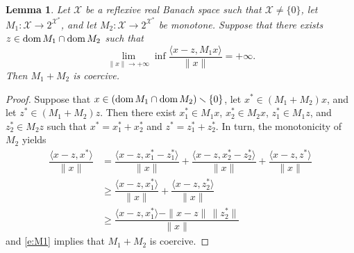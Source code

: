 \documentclass[a4paper,11pt,fleqn]{article}
\renewcommand{\geq}{\ensuremath{\geqslant}}
\newcommand{\pair}[2]{\langle{{#1},{#2}}\rangle}
\newcommand{\XX}{\ensuremath{{\mathcal X}}}
\newcommand{\pinf}{\ensuremath{{+\infty}}}
\newcommand{\dom}{\ensuremath{\text{\rm dom}\,}}
\newtheorem{lemma}[theorem]{Lemma}
\theoremstyle{plain}{\theorembodyfont{\rmfamily}%
\newtheorem{conjecture}[theorem]{Conjecture}}
\theoremstyle{plain}{\theorembodyfont{\rmfamily}%
\newtheorem{example}[theorem]{Example}}
\theoremstyle{plain}{\theorembodyfont{\rmfamily}%
\newtheorem{remark}[theorem]{Remark}}
\theoremstyle{plain}{\theorembodyfont{\rmfamily}%
\newtheorem{algorithm}[theorem]{Algorithm}}
\theoremstyle{plain}{\theorembodyfont{\rmfamily}%
\newtheorem{condition}[theorem]{Condition}}
\theoremstyle{plain}{\theorembodyfont{\rmfamily}%
\newtheorem{definition}[theorem]{Definition}}
\theoremstyle{plain}{\theorembodyfont{\rmfamily}
\newtheorem{problem}[theorem]{Problem}}
\theoremstyle{plain}{\theorembodyfont{\rmfamily}
\newtheorem{notation}[theorem]{Notation}}
\numberwithin{equation}{section}
\begin{document}
\begin{lemma}
\label{IVlhHg7yG02}
Let $\XX$ be a reflexive real Banach space such that 
$\XX\neq\{0\}$, let $M_1\colon\XX\to 2^{\XX^*}$, and let 
$M_2\colon\XX\to 2^{\XX^*}$ be monotone. Suppose that there 
exists $z\in\dom M_1\cap\dom M_2$ such that
\begin{equation}
\label{e:M1}
\lim\limits_{\|x\|\to+\infty}\inf\dfrac{\pair{x-z}{M_1x}}{\|x\|}
=\pinf.
\end{equation} 
Then $M_1+M_2$ is coercive.
\end{lemma}
\begin{proof}
Suppose that $x\in(\dom M_1\cap\dom M_2)\smallsetminus\{0\}$, let 
$x^*\in(M_1+M_2)x$, and let $z^*\in(M_1+M_2)z$. 
Then there exist $x_1^*\in M_1x$, 
$x_2^*\in M_2x$, $z_1^*\in M_1z$, and $z_2^*\in M_2z$ such that
$x^*=x_1^*+x_2^*$ and $z^*=z_1^*+z_2^*$. In turn, the monotonicity
of $M_2$ yields
\begin{align}
\dfrac{\pair{x-z}{x^*}}{\|x\|}
&=\dfrac{\pair{x-z}{x_1^*-z_1^*}}{\|x\|}
+\dfrac{\pair{x-z}{x_2^*-z_2^*}}{\|x\|}
+\dfrac{\pair{x-z}{z^*}}{\|x\|}\nonumber\\
&\geq\dfrac{\pair{x-z}{x_1^*}}{\|x\|}
+\dfrac{\pair{x-z}{z_2^*}}{\|x\|}\nonumber\\
&\geq\dfrac{\pair{x-z}{x_1^*}-\|x-z\|\,\|z_2^*\|}{\|x\|}
\end{align}
and \eqref{e:M1} implies that $M_1+M_2$ is coercive.
\end{proof}
\end{document}
